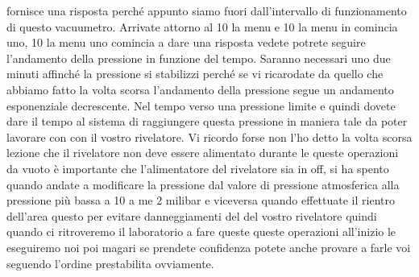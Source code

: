 fornisce una risposta perché appunto siamo fuori dall'intervallo di funzionamento di questo vacuumetro. Arrivate attorno al 10 la menu e 10 la menu in comincia uno, 10 la menu uno comincia a dare una risposta vedete potrete seguire l'andamento della pressione in funzione del tempo. Saranno necessari uno due minuti affinché la pressione si stabilizzi perché se vi ricarodate da quello che abbiamo fatto la volta scorsa l'andamento della pressione segue un andamento esponenziale decrescente. Nel tempo verso una pressione limite e quindi dovete dare il tempo al sistema di raggiungere questa pressione in maniera tale da poter lavorare con con il vostro rivelatore. Vi ricordo forse non l'ho detto la volta scorsa lezione che il rivelatore non deve essere alimentato durante le queste operazioni da vuoto è importante che l'alimentatore del rivelatore sia in off, si ha spento quando andate a modificare la pressione dal valore di pressione atmosferica alla pressione più bassa a 10 a me 2 milibar e viceversa quando effettuate il rientro dell'area questo per evitare danneggiamenti del del vostro rivelatore quindi quando ci ritroveremo il laboratorio a fare queste queste operazioni all'inizio le eseguiremo noi poi magari se prendete confidenza potete anche provare a farle voi seguendo l'ordine prestabilita ovviamente.